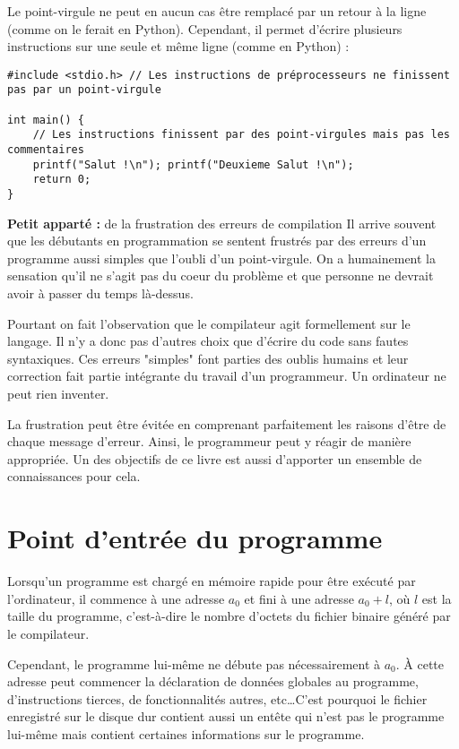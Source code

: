 \documentclass[../../../main.tex]{subfiles}
\begin{document}
Le point-virgule ne peut en aucun cas être remplacé par un retour à la ligne (comme on le ferait en Python). Cependant, il permet d'écrire plusieurs instructions sur une seule et même ligne (comme en Python) :
\begin{verbatim}
#include <stdio.h> // Les instructions de préprocesseurs ne finissent pas par un point-virgule

int main() {
	// Les instructions finissent par des point-virgules mais pas les commentaires
	printf("Salut !\n"); printf("Deuxieme Salut !\n"); 
	return 0;
}
\end{verbatim}

\begin{minitelbasicbox}{\textbf{Petit apparté :} de la frustration des erreurs de compilation}
Il arrive souvent que les débutants en programmation se sentent frustrés par des erreurs d'un programme aussi simples que l'oubli d'un point-virgule. On a humainement la sensation qu'il ne s'agit pas du coeur du problème et que personne ne devrait avoir à passer du temps là-dessus.

Pourtant on fait l'observation que le compilateur agit formellement sur le langage. Il n'y a donc pas d'autres choix que d'écrire du code sans fautes syntaxiques. Ces erreurs "simples" font parties des oublis humains et leur correction fait partie intégrante du travail d'un programmeur. Un ordinateur ne peut rien inventer.

La frustration peut être évitée en comprenant parfaitement les raisons d'être de chaque message d'erreur. Ainsi, le programmeur peut y réagir de manière appropriée. Un des objectifs de ce livre est aussi d'apporter un ensemble de connaissances pour cela.
\end{minitelbasicbox}
\section{Point d'entrée du programme}\label{sec:point_d_entr_e_du_programme}
Lorsqu'un programme est chargé en mémoire rapide pour être exécuté par l'ordinateur, il commence à une adresse $a_{0}$ et fini à une adresse $a_{0} + l$, où $l$ est la taille du programme, c'est-à-dire le nombre d'octets du fichier binaire généré par le compilateur.
 
Cependant, le programme lui-même ne débute pas nécessairement à $a_{0}$. À cette adresse peut commencer la déclaration de données globales au programme, d'instructions tierces, de fonctionnalités autres, etc\dots C'est pourquoi le fichier enregistré sur le disque dur contient aussi un entête qui n'est pas le programme lui-même mais contient certaines informations sur le programme.
\end{document}
